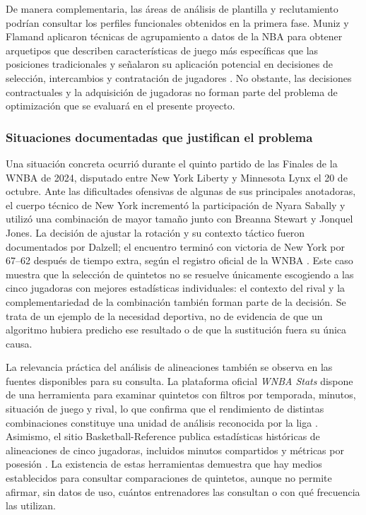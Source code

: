 De manera complementaria, las áreas de análisis de plantilla y reclutamiento podrían consultar los perfiles funcionales obtenidos en la primera fase. Muniz y Flamand aplicaron técnicas de agrupamiento a datos de la NBA para obtener arquetipos que describen características de juego más específicas que las posiciones tradicionales y señalaron su aplicación potencial en decisiones de selección, intercambios y contratación de jugadores \cite{muniz2022weightednetwork}. No obstante, las decisiones contractuales y la adquisición de jugadoras no forman parte del problema de optimización que se evaluará en el presente proyecto.

\subsubsection*{Situaciones documentadas que justifican el problema}

Una situación concreta ocurrió durante el quinto partido de las Finales de la WNBA de 2024, disputado entre New York Liberty y Minnesota Lynx el 20 de octubre. Ante las dificultades ofensivas de algunas de sus principales anotadoras, el cuerpo técnico de New York incrementó la participación de Nyara Sabally y utilizó una combinación de mayor tamaño junto con Breanna Stewart y Jonquel Jones. La decisión de ajustar la rotación y su contexto táctico fueron documentados por Dalzell; el encuentro terminó con victoria de New York por 67--62 después de tiempo extra, según el registro oficial de la WNBA \cite{dalzell2024libertyadjustment,wnba2024finalsgame5}. Este caso muestra que la selección de quintetos no se resuelve únicamente escogiendo a las cinco jugadoras con mejores estadísticas individuales: el contexto del rival y la complementariedad de la combinación también forman parte de la decisión. Se trata de un ejemplo de la necesidad deportiva, no de evidencia de que un algoritmo hubiera predicho ese resultado o de que la sustitución fuera su única causa.

La relevancia práctica del análisis de alineaciones también se observa en las fuentes disponibles para su consulta. La plataforma oficial \textit{WNBA Stats} dispone de una herramienta para examinar quintetos con filtros por temporada, minutos, situación de juego y rival, lo que confirma que el rendimiento de distintas combinaciones constituye una unidad de análisis reconocida por la liga \cite{wnbaStatsLineupsTool}. Asimismo, el sitio Basketball-Reference publica estadísticas históricas de alineaciones de cinco jugadoras, incluidos minutos compartidos y métricas por posesión \cite{basketballReferenceLiberty2024Lineups}. La existencia de estas herramientas demuestra que hay medios establecidos para consultar comparaciones de quintetos, aunque no permite afirmar, sin datos de uso, cuántos entrenadores las consultan o con qué frecuencia las utilizan.

